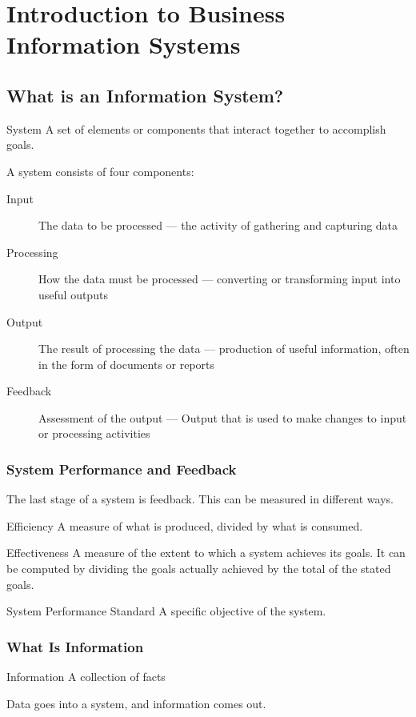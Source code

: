 \documentclass[\main/notes.tex]{subfiles}
\begin{document}
	\chapter[Introduction]{Introduction to Business Information Systems}
		\section{What is an Information System?}
			\begin{definition}{System}
				A set of elements or components that interact together to accomplish goals.
			\end{definition}
			A system consists of four components:
			\begin{description}
				\item[Input] The data to be processed --- the activity of gathering and capturing data
				\item[Processing] How the data must be processed --- converting or transforming input into useful outputs
				\item[Output] The result of processing the data --- production of useful information, often in the form of documents or reports
				\item[Feedback] Assessment of the output --- Output that is used to make changes to input or processing activities
			\end{description}
			\subsection{System Performance and Feedback}
				The last stage of a system is feedback. This can be measured in different ways.
				\begin{definition}{Efficiency}
					A measure of what is produced, divided by what is consumed.
				\end{definition}
				\begin{definition}{Effectiveness}
					A measure of the extent to which a system achieves its goals. It can be computed by dividing the goals actually achieved by the total of the stated goals.
				\end{definition}
				\begin{definition}{System Performance Standard}
					A specific objective of the system.
				\end{definition}
			\subsection{What Is Information}
				\begin{definition}{Information}
					A collection of facts
				\end{definition}
				Data goes into a system, and information comes out.
\end{document}
